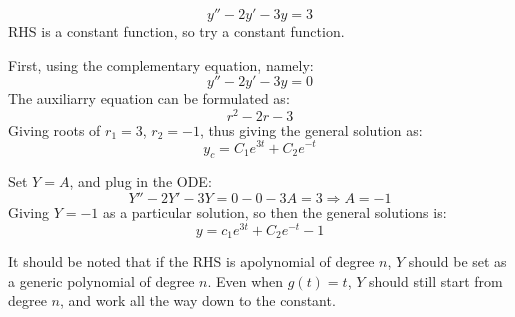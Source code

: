\documentclass[12pt]{article}
\begin{document}
\begin{example}
  \begin{equation*}
    y'' - 2y' - 3y = 3
  \end{equation*}
  RHS is a constant function, so try a constant function.

  First, using the complementary equation, namely:
  \begin{equation*}
    y'' - 2y' - 3y = 0
  \end{equation*}
  The auxiliarry equation can be formulated as:
  \begin{equation*}
    r^2 - 2r - 3
  \end{equation*}
  Giving roots of $r_1=3$, $r_2=-1$, thus giving the general solution as:
  \begin{equation*}
    y_c = C_1e^{3t} + C_2e^{-t}
  \end{equation*}

  Set $Y=A$, and plug in the ODE:
  \begin{equation*}
    Y'' - 2Y' - 3Y = 0 - 0 - 3A = 3 \Rightarrow A = -1
  \end{equation*}
  Giving $Y=-1$ as a particular solution, so then the general solutions is:
  \begin{equation*}
    y = c_1e^{3t} + C_2e^{-t} - 1
  \end{equation*}
\end{example}
It should be noted that if the RHS is apolynomial of degree $n$, $Y$ should be set as a generic polynomial of degree $n$. Even when $g(t) = t$, $Y$ should still start from degree $n$, and work all the way down to the constant.
\end{document}
